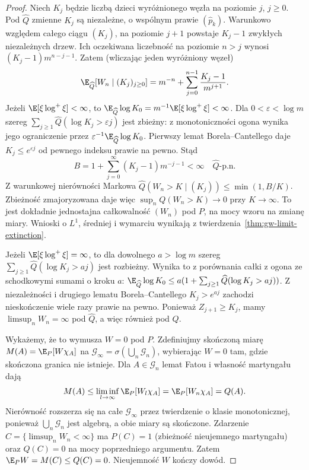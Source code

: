 \begin{proof}
Niech $K_j$ będzie liczbą dzieci wyróżnionego
węzła na poziomie $j$, $j\ge0$. Pod $\widehat Q$
zmienne $K_j$ są niezależne, o wspólnym prawie
$(\widehat p_k)$. Warunkowo względem całego
ciągu $(K_j)$, na poziomie $j+1$ powstaje
$K_j-1$ zwykłych niezależnych drzew.
Ich oczekiwana liczebność na poziomie $n>j$
wynosi $(K_j-1)m^{n-j-1}$.
Zatem (wliczając jeden wyróżniony węzeł)
\[
\E_{\widehat Q}[W_n\mid (K_j)_{j\ge0}]
=m^{-n}+\sum_{j=0}^{n-1}\frac{K_j-1}{m^{j+1}}.
\]
Jeżeli $\E[\xi\log^+\xi]<\infty$, to
$\E_{\widehat Q}\log K_0
=m^{-1}\E[\xi\log^+\xi]<\infty$.
Dla $0<\varepsilon<\log m$ szereg
$\sum_{j\ge1}\widehat Q(\log K_j>\varepsilon j)$
jest zbieżny: z monotoniczności ogona wynika
jego ograniczenie przez
$\varepsilon^{-1}\E_{\widehat Q}\log K_0$.
Pierwszy lemat Borela--Cantellego daje
$K_j\le e^{\varepsilon j}$ od pewnego indeksu
prawie na pewno. Stąd
\[
B=1+\sum_{j=0}^\infty (K_j-1)m^{-j-1}<\infty
\quad\widehat Q\text{-p.n.}
\]
Z warunkowej nierówności Markowa
$\widehat Q(W_n>K\mid (K_j))\le\min(1,B/K)$.
Zbieżność zmajoryzowana daje więc
$\sup_n Q(W_n>K)\to0$ przy $K\to\infty$.
To jest dokładnie jednostajna całkowalność
$(W_n)$ pod $P$, na mocy wzoru na zmianę miary.
Wnioski o $L^1$, średniej i wymarciu wynikają
z twierdzenia~\ref{thm:gw-limit-extinction}.

Jeżeli $\E[\xi\log^+\xi]=\infty$, to dla
dowolnego $a>\log m$ szereg
$\sum_{j\ge1}\widehat Q(\log K_j>aj)$ jest
rozbieżny. Wynika to z porównania całki z ogona
ze schodkowymi sumami o kroku $a$:
$\E_{\widehat Q}\log K_0\le
a(1+\sum_{j\ge1}\widehat Q(\log K_j>aj))$.
Z niezależności i drugiego lematu Borela--Cantellego
$K_j>e^{aj}$ zachodzi nieskończenie wiele razy
prawie na pewno. Ponieważ $Z_{j+1}\ge K_j$,
mamy $\limsup_n W_n=\infty$ pod $\widehat Q$,
a więc również pod $Q$.

Wykażemy, że to wymusza $W=0$ pod $P$.
Zdefiniujmy skończoną miarę
$M(A)=\E_P[W\chi_A]$ na
$\mathcal G_\infty=\sigma(\bigcup_n\mathcal G_n)$,
wybierając $W=0$ tam, gdzie skończona granica nie istnieje.
Dla $A\in\mathcal G_n$ lemat Fatou i własność
martyngału dają
\[
M(A)\le\liminf_{l\to\infty}\E_P[W_l\chi_A]
=\E_P[W_n\chi_A]=Q(A).
\]
Nierówność rozszerza się na całe
$\mathcal G_\infty$ przez twierdzenie o klasie
monotonicznej, ponieważ $\bigcup_n\mathcal G_n$
jest algebrą, a obie miary są skończone.
Zdarzenie $C=\{\limsup_n W_n<\infty\}$ ma
$P(C)=1$ (zbieżność nieujemnego martyngału)
oraz $Q(C)=0$ na mocy poprzedniego argumentu.
Zatem $\E_P W=M(C)\le Q(C)=0$.
Nieujemność $W$ kończy dowód.
\end{proof}

